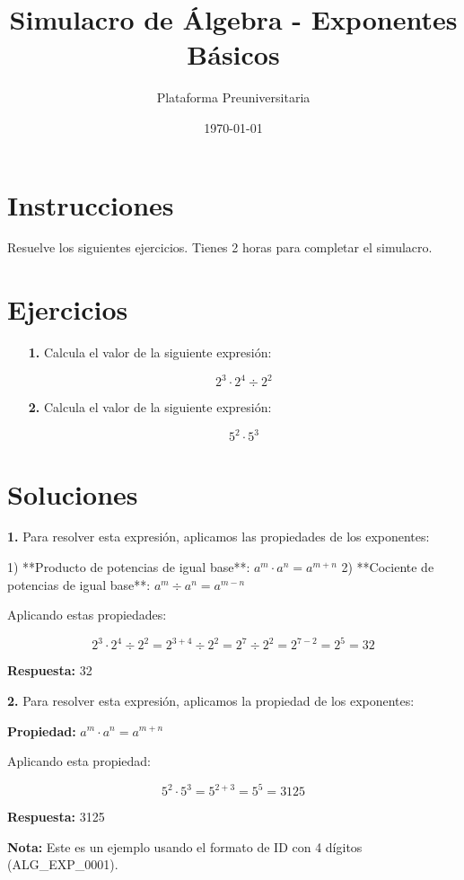 \documentclass[12pt,a4paper]{article}
\title{\Huge \textbf{Simulacro de Álgebra - Exponentes Básicos}}
\author{Plataforma Preuniversitaria}
\date{\today}
\begin{document}
\maketitle

\section*{Instrucciones}
Resuelve los siguientes ejercicios. Tienes 2 horas para completar el simulacro.

\section*{Ejercicios}


\begin{enumerate}
\item[\textbf{1.}] Calcula el valor de la siguiente expresión:

$$2^3 \cdot 2^4 \div 2^2$$
\end{enumerate}

\vspace{1cm}


\begin{enumerate}
\item[\textbf{2.}] Calcula el valor de la siguiente expresión:

$$5^2 \cdot 5^3$$
\end{enumerate}

\vspace{1cm}


\newpage
\section*{Soluciones}


\textbf{1.} Para resolver esta expresión, aplicamos las propiedades de los exponentes:

1) **Producto de potencias de igual base**: $a^m \cdot a^n = a^{m+n}$
2) **Cociente de potencias de igual base**: $a^m \div a^n = a^{m-n}$

Aplicando estas propiedades:

$$2^3 \cdot 2^4 \div 2^2 = 2^{3+4} \div 2^2 = 2^7 \div 2^2 = 2^{7-2} = 2^5 = 32$$

\textbf{Respuesta:} 32

\vspace{0.5cm}


\textbf{2.} Para resolver esta expresión, aplicamos la propiedad de los exponentes:

\textbf{Propiedad:} $a^m \cdot a^n = a^{m+n}$

Aplicando esta propiedad:

$$5^2 \cdot 5^3 = 5^{2+3} = 5^5 = 3125$$

\textbf{Respuesta:} 3125

\textbf{Nota:} Este es un ejemplo usando el formato de ID con 4 dígitos (ALG\_EXP\_0001).

\vspace{0.5cm}
\end{document}
